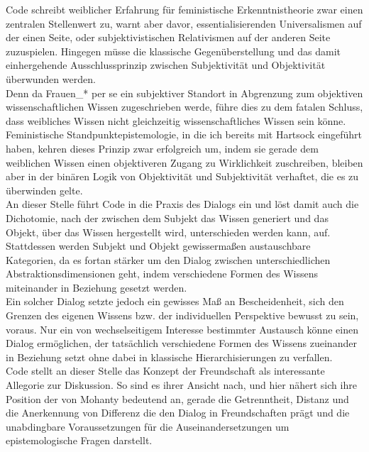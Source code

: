 \noindent Code schreibt weiblicher Erfahrung für feministische Erkenntnistheorie zwar
einen zentralen Stellenwert zu, warnt aber davor, essentialisierenden
Universalismen auf der einen Seite, oder subjektivistischen Relativismen auf der
anderen Seite zuzuspielen. Hingegen müsse die klassische Gegenüberstellung und
das damit einhergehende Ausschlussprinzip zwischen Subjektivität und
Objektivität überwunden werden.\\
 Denn da Frauen\_* per se ein subjektiver
Standort in Abgrenzung zum objektiven wissenschaftlichen Wissen zugeschrieben
werde, führe dies zu dem fatalen Schluss, dass weibliches Wissen nicht
gleichzeitig wissenschaftliches Wissen sein könne.\footnotemark
{}\\ 

\noindent Feministische Standpunktepistemologie, in die ich bereits mit Hartsock eingeführt haben, kehren dieses Prinzip zwar erfolgreich um, indem sie gerade dem weiblichen Wissen einen objektiveren Zugang zu Wirklichkeit zuschreiben, bleiben aber in der binären Logik von Objektivität und Subjektivität verhaftet, die es zu überwinden gelte.\\

\noindent An dieser Stelle führt Code in die Praxis des Dialogs ein und löst damit auch die Dichotomie, nach der zwischen dem Subjekt das Wissen generiert und das Objekt, über das Wissen hergestellt wird, unterschieden werden kann, auf.
Stattdessen werden Subjekt und Objekt gewissermaßen austauschbare Kategorien, da
es fortan stärker um den Dialog zwischen unterschiedlichen
Abstraktionsdimensionen geht, indem verschiedene Formen des Wissens miteinander
in Beziehung gesetzt werden.\footnotemark {}\\
Ein solcher Dialog setzte jedoch ein gewisses Maß an Bescheidenheit, sich den
Grenzen des eigenen Wissens bzw. der individuellen Perspektive bewusst zu sein,
voraus. Nur ein von wechselseitigem Interesse bestimmter Austausch könne einen
Dialog ermöglichen, der tatsächlich verschiedene Formen des Wissens zueinander
in Beziehung setzt ohne dabei in klassische Hierarchisierungen zu verfallen.\\
Code stellt an dieser Stelle das Konzept der Freundschaft als interessante
Allegorie zur Diskussion. So sind es ihrer Ansicht nach, und hier nähert sich
ihre Position der von Mohanty bedeutend an, gerade die Getrenntheit, Distanz und
die Anerkennung von Differenz die den Dialog in Freundschaften prägt und die
unabdingbare Voraussetzungen für die Auseinandersetzungen um epistemologische
Fragen darstellt.\footnotemark {}\\

